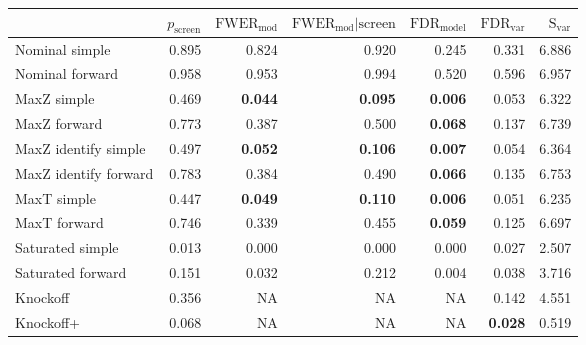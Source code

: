 
\newcommand{\guarantee}[1]{{\bf #1}}
\begin{tabular}{|l|rrrrrr|}
 \hline
{} &  $p_{\text{screen}}$ &  $\text{FWER}_{\text{mod}}$ &  $\text{FWER}_{\text{mod}} \vert \text{screen}$ &  $\text{FDR}_{\text{model}}$ &  $\text{FDR}_{\text{var}}$ &  $\text{S}_{\text{var}}$ \\ \hline
Nominal simple & 0.895 & 0.824 & 0.920 & 0.245 & 0.331 & 6.886 \\ 
Nominal forward & 0.958 & 0.953 & 0.994 & 0.520 & 0.596 & 6.957 \\ 
MaxZ simple & 0.469 & \guarantee{0.044} & \guarantee{0.095} & \guarantee{0.006} & 0.053 & 6.322 \\ 
MaxZ forward & 0.773 & 0.387 & 0.500 & \guarantee{0.068} & 0.137 & 6.739 \\ 
MaxZ identify simple & 0.497 & \guarantee{0.052} & \guarantee{0.106} & \guarantee{0.007} & 0.054 & 6.364 \\ 
MaxZ identify forward & 0.783 & 0.384 & 0.490 & \guarantee{0.066} & 0.135 & 6.753 \\ 
MaxT simple & 0.447 & \guarantee{0.049} & \guarantee{0.110} & \guarantee{0.006} & 0.051 & 6.235 \\ 
MaxT forward & 0.746 & 0.339 & 0.455 & \guarantee{0.059} & 0.125 & 6.697 \\ 
Saturated simple & 0.013 & 0.000 & 0.000 & 0.000 & 0.027 & 2.507 \\ 
Saturated forward & 0.151 & 0.032 & 0.212 & 0.004 & 0.038 & 3.716 \\ 
Knockoff & 0.356 & NA & NA & NA & 0.142 & 4.551 \\ 
Knockoff+ & 0.068 & NA & NA & NA & \guarantee{0.028} & 0.519 \\   \hline
\end{tabular}